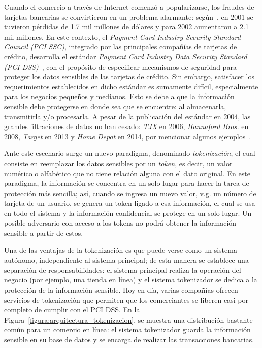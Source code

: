 \documentclass[conference]{IEEEtran}
\begin{document}
  Cuando el comercio a través de Internet comenzó a popularizarse, los fraudes
  de tarjetas bancarias se convirtieron en un problema alarmante:
  según~\cite{wallethub}, en 2001 se tuvieron pérdidas de 1.7 mil millones de
  dólares y para 2002 aumentaron a 2.1 mil millones. En este contexto, el {\it
  Payment Card Industry Security Standard Council (PCI SSC)}, integrado por las
  principales compañías de tarjetas de crédito, desarrolla el estándar
  \textit{Payment Card Industry Data Security Standard (PCI
  DSS)}~\cite{pci_dss}, con el propósito de especificar mecanismos de seguridad
  para proteger los datos sensibles de las tarjetas de crédito. Sin embargo,
  satisfacer los requerimientos establecidos en dicho estándar es sumamente
  difícil, especialmente para los negocios pequeños y medianos. Esto se debe a
  que la información sensible debe protegerse en donde sea que se encuentre: al
  almacenarla, transmitirla y/o procesarla. A pesar de la publicación del
  estándar en 2004, las grandes filtraciones de datos no han cesado:
  \textit{TJX} en 2006, \textit{Hannaford Bros.} en 2008, \textit{Target} en
  2013 y \textit{Home Depot} en 2014, por mencionar algunos
  ejemplos~\cite{wallethub}.

  Ante este escenario surge un nuevo paradigma, denominado {\it tokenización},
  el cual consiste en reemplazar los datos sensibles por un {\it token}, es
  decir, un valor numérico o alfabético que no tiene relación alguna con el dato
  original. En este paradigma, la información se concentra en un solo
  lugar para hacer la tarea de protección más sencilla; así, cuando se ingresa
  un nuevo valor, v.g. un número de tarjeta de un usuario, se genera un
  token ligado a esa información, el cual se usa en todo el sistema y la
  información confidencial se protege en un solo lugar. Un posible adversario con
  acceso a los tokens no podrá obtener la información sensible a partir de
  estos.

  Una de las ventajas de la tokenización es que puede verse como un sistema
  autónomo, independiente al sistema principal; de esta manera se establece una
  separación de responsabilidades: el sistema principal realiza la operación del
  negocio (por ejemplo, una tienda en línea) y el sistema tokenizador se dedica
  a la protección de la información sensible. Hoy en día, varias compañías
  ofrecen servicios de tokenización que permiten que los comerciantes se liberen
  casi por completo de cumplir con el PCI DSS. En la
  Figura~\ref{figura:arquitectura_tokenizacion}, se muestra una distribución
  bastante común para un comercio en línea: el sistema tokenizador guarda la
  información sensible en su base de datos y se encarga de realizar las
  transacciones bancarias.
\end{document}
